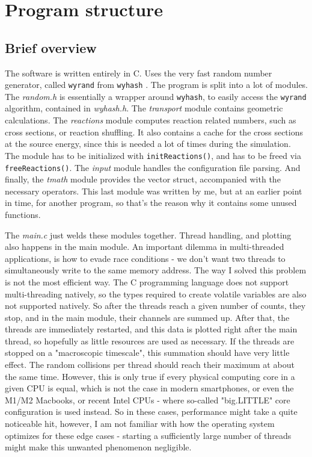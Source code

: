 \documentclass[a4paper,12pt]{article}
\begin{document}
\section{Program structure}
\subsection{Brief overview}
The software is written entirely in C. Uses the very fast random number generator, called \texttt{wyrand} from \texttt{wyhash} \cite{wyrandgit}. The program is split into a lot of modules. The \textit{random.h} is essentially a wrapper around \texttt{wyhash}, to easily access the \texttt{wyrand} algorithm, contained in \textit{wyhash.h}. The \textit{transport} module contains geometric calculations. The \textit{reactions} module computes reaction related numbers, such as cross sections, or reaction shuffling. It also contains a cache for the cross sections at the source energy, since this is needed a lot of times during the simulation. The module has to be initialized with \texttt{initReactions()}, and has to be freed via \texttt{freeReactions()}. The \textit{input} module handles the configuration file parsing. And finally, the \textit{tmath} module provides the vector struct, accompanied with the necessary operators. This last module was written by me, but at an earlier point in time, for another program, so that's the reason why it contains some unused functions.

The \textit{main.c} just welds these modules together. Thread handling, and plotting also happens in the main module. An important dilemma in multi-threaded applications, is how to evade race conditions - we don't want two threads to simultaneously write to the same memory address. The way I solved this problem is not the most efficient way. The C programming language does not support multi-threading natively, so the types required to create volatile variables are also not supported natively. So after the threads reach a given number of counts, they stop, and in the main module, their channels are summed up. After that, the threads are immediately restarted, and this data is plotted right after the main thread, so hopefully as little resources are used as necessary. If the threads are stopped on a "macroscopic timescale", this summation should have very little effect. The random collisions per thread should reach their maximum at about the same time. However, this is only true if every physical computing core in a given CPU is equal, which is not the case in modern smartphones, or even the M1/M2 Macbooks, or recent Intel CPUs - where so-called "big.LITTLE" core configuration is used instead. So in these cases, performance might take a quite noticeable hit, however, I am not familiar with how the operating system optimizes for these edge cases - starting a sufficiently large number of threads might make this unwanted phenomenon negligible.
\end{document}
